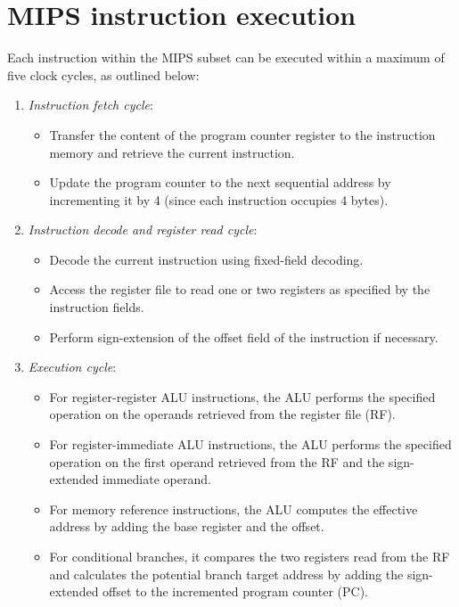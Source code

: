 \section{MIPS instruction execution}

Each instruction within the MIPS subset can be executed within a maximum of five clock cycles, as outlined below:
\begin{enumerate}
    \item \textit{Instruction fetch cycle}: 
        \begin{itemize}
            \item Transfer the content of the program counter register to the instruction memory and retrieve the current instruction.
            \item Update the program counter to the next sequential address by incrementing it by 4 (since each instruction occupies 4 bytes).
        \end{itemize}
    \item \textit{Instruction decode and register read cycle}: 
        \begin{itemize}
            \item Decode the current instruction using fixed-field decoding.
            \item Access the register file to read one or two registers as specified by the instruction fields.
            \item Perform sign-extension of the offset field of the instruction if necessary.
        \end{itemize}
    \item \textit{Execution cycle}: 
        \begin{itemize}
            \item For register-register ALU instructions, the ALU performs the specified operation on the operands retrieved from the register file (RF).
            \item For register-immediate ALU instructions, the ALU performs the specified operation on the first operand retrieved from the RF and the sign-extended immediate operand.
            \item For memory reference instructions, the ALU computes the effective address by adding the base register and the offset.
            \item For conditional branches, it compares the two registers read from the RF and calculates the potential branch target address by adding the sign-extended offset to the incremented program counter (PC).

\end{itemize}
\end{enumerate}
